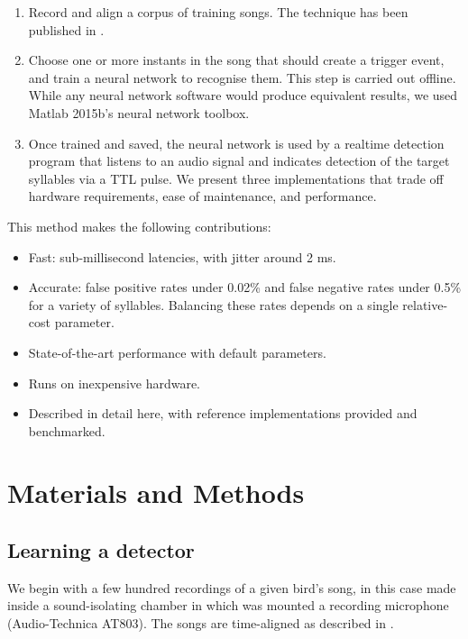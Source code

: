 \documentclass[10pt,letterpaper]{article}
\begin{document}
\begin{enumerate}
\item Record and align a corpus of training songs.  The technique has been published in \cite{Poole2012}.
\item Choose one or more instants in the song that should create a trigger event, and train a
  neural network to recognise them. This step is carried out offline.  While any neural network software would produce equivalent results, we used Matlab 2015b's neural network toolbox.
\item Once trained and saved, the neural network is used by a realtime
  detection program that listens to an audio signal and indicates detection of the target
  syllables via a TTL pulse.  We present three implementations that trade off hardware requirements, ease of maintenance, and performance.
\end{enumerate}
This method makes the following contributions:
\begin{itemize}
\item Fast: sub-millisecond latencies, with jitter around 2 ms.
\item Accurate: false positive rates under 0.02\% and false negative rates under 0.5\% for a variety of syllables.  Balancing these rates depends on a single relative-cost parameter.
\item State-of-the-art performance with default parameters.
\item Runs on inexpensive hardware.
\item Described in detail here, with reference implementations provided and benchmarked.
\end{itemize}



\section{Materials and Methods}
\label{sec:method}


\subsection{Learning a detector}

We begin with a few hundred recordings of a given bird's song, in this
case made inside a sound-isolating chamber in which was mounted a
recording microphone (Audio-Technica AT803).  The songs are
time-aligned as described in \cite{Poole2012}.
\end{document}
